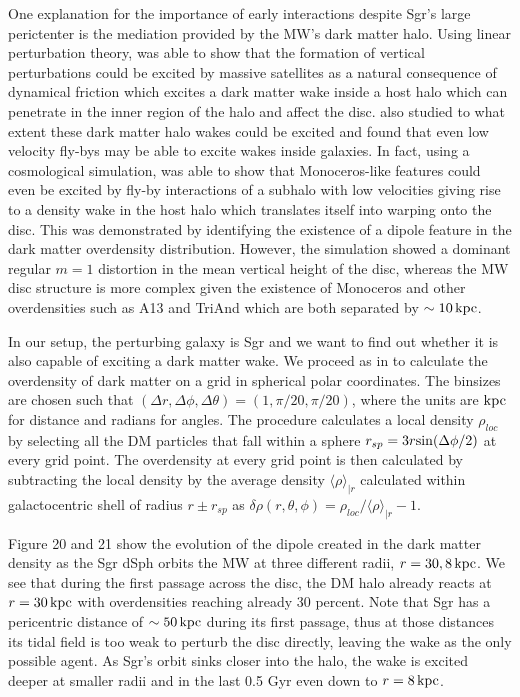 \documentclass[useAMS,usenatbib]{mnras}
\begin{document}
One explanation for the importance of early interactions despite Sgr's large perictenter is the mediation provided by the MW's dark matter halo. Using linear perturbation theory, \cite{weinberg98} was able to show that the formation of vertical perturbations could be excited by massive satellites as a natural consequence of dynamical friction which excites a dark matter wake inside a host halo which can penetrate in the inner region of the halo and affect the disc. \cite{vesperini00} also studied to what extent these dark matter halo wakes could be excited and found that even low velocity fly-bys may be able to excite wakes inside galaxies. In fact, using a cosmological simulation, \cite{gomez15b} was able to show that Monoceros-like features could even be excited by fly-by interactions of a subhalo with low velocities giving rise to a density wake in the host halo which translates itself into warping onto the disc. This was demonstrated by identifying the existence of a dipole feature in the dark matter overdensity distribution.  However, the simulation showed a dominant regular $m=1$ distortion in the mean vertical height of the disc, whereas the MW disc structure is more complex given the existence of Monoceros and other overdensities such as A13 and TriAnd which are both separated by $\sim 10 \,\rm{kpc}$. 

In our setup, the perturbing galaxy is Sgr and we want to find out whether it is also capable of exciting a dark matter wake. We proceed as in \cite{gomez15b} to calculate the overdensity of dark matter on a grid in spherical polar coordinates. The binsizes are chosen such that $(\Delta r,\Delta\phi, \Delta\theta)=(1, \pi/20, \pi/20)$, where the units are $\rm{kpc}$ for distance and radians for angles. The procedure calculates  a local density $\rho_{loc}$ by selecting all the DM particles that fall within a sphere $r_{sp}=3r\rm{sin}(\Delta\phi/2)$ at every grid point. The overdensity at every grid point is then calculated by subtracting the local density by the average density $\langle\rho\rangle_{|r}$ calculated within galactocentric shell of radius $r\pm r_{sp}$ as $\delta\rho(r,\theta,\phi)=\rho_{loc}/\langle\rho\rangle_{|r} -1$.

Figure 20 and 21 show the evolution of the dipole created in the dark matter density as the Sgr dSph orbits the MW at three different radii, $r=30, 8 \,\rm{kpc}$. We see that during the first passage across the disc, the DM halo already reacts at $r=30\,\rm{kpc}$ with overdensities reaching already 30 percent. Note that Sgr has a pericentric distance of $\sim 50 \,\rm{kpc}$ during its first passage, thus at those distances its tidal field is too weak to perturb the disc directly, leaving the wake as the only possible agent. As Sgr's orbit sinks closer into the halo, the wake is excited deeper at smaller radii and in the last 0.5 Gyr even down to $r=8 \,\rm{kpc}$. 
\end{document}
